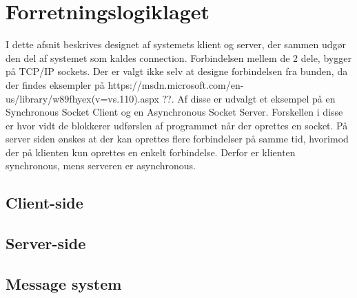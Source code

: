 \chapter{Forretningslogiklaget}
I dette afsnit beskrives designet af systemets klient og server, der sammen udgør den del af systemet som kaldes connection. Forbindelsen mellem de 2 dele, bygger på TCP/IP sockets. Der er valgt ikke selv at designe forbindelsen fra bunden, da der findes eksempler på https://msdn.microsoft.com/en-us/library/w89fhyex(v=vs.110).aspx ??. Af disse er udvalgt et eksempel på en Synchronous Socket Client og en Asynchronous Socket Server. Forskellen i disse er hvor vidt de blokkerer udførslen af programmet når der oprettes en socket. På server siden ønskes at der kan oprettes flere forbindelser på samme tid, hvorimod der på klienten kun oprettes en enkelt forbindelse. Derfor er klienten synchronous, mens serveren er asynchronous.
\section{Client-side}

\section{Server-side}

\section{Message system}

%
%